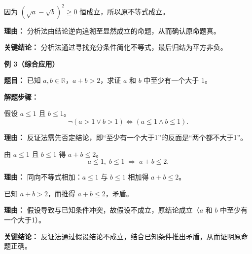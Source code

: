 \begin{examplebox}
\begin{description}[style=nextline, leftmargin=2.8em, labelsep=0.5em, itemsep=0.45em]
		\item[\textbf{第三步（结论肯定）：}]
			因为 $(\sqrt{a}-\sqrt{b})^2 \ge 0$ 恒成立，所以原不等式成立。
			\par\textbf{理由：}
			分析法由结论逆向追溯至显然成立的命题，从而确认原命题真。
	\end{description}

	\textbf{\textcolor{CExample}{关键结论：}}
	分析法通过寻找充分条件简化不等式，最后归结为平方非负。

	\medskip
	\textbf{\textcolor{CExample}{例 3（综合应用）}}

	\textbf{\textcolor{CExample}{题目：}}
	已知 $a,b \in \mathbb{R}$，$a+b > 2$，求证 $a$ 和 $b$ 中至少有一个大于 $1$。

	\textbf{\textcolor{CExample}{解题步骤：}}
	\begin{description}[style=nextline, leftmargin=2.8em, labelsep=0.5em, itemsep=0.45em]
		\item[\textbf{第一步（假设反面）：}]
			假设 $a\le 1$ 且 $b\le 1$。
			\[
				\neg(a>1 \lor b>1) \Longleftrightarrow (a\le 1 \land b\le 1).
			\]
			\par\textbf{理由：}
			反证法需先否定结论，即“至少有一个大于1”的反面是“两个都不大于1”。

		\item[\textbf{第二步（推出矛盾）：}]
			由 $a\le1$ 且 $b\le1$ 得 $a+b \le 2$。
			\[
				a\le1,\; b\le1 \;\Longrightarrow\; a+b \le 2.
			\]
			\par\textbf{理由：}
			同向不等式相加：$a\le1$ 与 $b\le1$ 相加得 $a+b\le2$。

		\item[\textbf{第三步（矛盾形成）：}]
			已知 $a+b > 2$，而推得 $a+b \le 2$，矛盾。
			\par\textbf{理由：}
			假设导致与已知条件冲突，故假设不成立，原结论成立（$a$ 和 $b$ 中至少有一个大于1）。
	\end{description}

	\textbf{\textcolor{CExample}{关键结论：}}
	反证法通过假设结论不成立，结合已知条件推出矛盾，从而证明原命题正确。
\end{examplebox}
